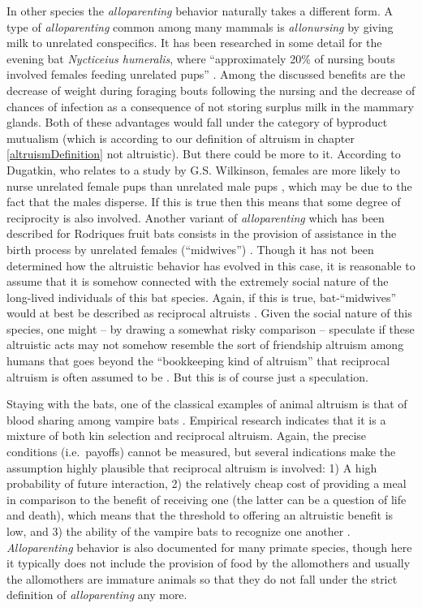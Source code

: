In other species the {\em alloparenting} behavior naturally takes a different
form. A type of {\em alloparenting} common among many mammals is {\em
  allonursing} by giving milk to unrelated conspecifics. It has been
researched in some detail for the evening bat {\em Nycticeius humeralis},
where ``approximately 20\% of nursing bouts involved females feeding unrelated
pups'' \cite[p.\  109]{dugatkin:1997}. Among the discussed benefits are the
decrease of weight during foraging bouts following the nursing and the
decrease of chances of infection as a consequence of not storing surplus milk
in the mammary glands. Both of these advantages would fall under the category
of byproduct mutualism (which is according to our definition of altruism in
chapter \ref{altruismDefinition} not altruistic). But there could be more to
it. According to Dugatkin, who relates to a study by G.S. Wilkinson, females
are more likely to nurse unrelated female pups than unrelated male pups
\cite[p.\ 109]{dugatkin:1997}, which may be due to the fact that the males
disperse. If
this is true then this means that some degree of reciprocity is also involved.
Another variant of {\em alloparenting} which has been described for Rodriques
fruit bats consists in the provision of assistance in the birth process by
unrelated females (``midwives'') \cite[p.\  109]{dugatkin:1997}. Though it has
not been determined how the altruistic behavior has evolved in this case, it
is reasonable to assume that it is somehow connected with the extremely social
nature of the long-lived individuals of this bat species. Again, if this is
true, bat-``midwives'' would at best be described as reciprocal altruists
\cite[p.\ 109]{dugatkin:1997}. Given the social nature of this species, one
might -- by drawing a somewhat risky comparison -- speculate if these
altruistic acts may not somehow resemble the sort of friendship altruism among
humans that goes beyond the ``bookkeeping kind of altruism'' that reciprocal
altruism is often assumed to be \cite[]{silk:2003}. But this is of course just
a speculation.

Staying with the bats, one of the classical examples of animal altruism is
that of blood sharing among vampire bats \cite[p.\ 113/114]{dugatkin:1997}.
Empirical research indicates that it is a mixture of both kin selection and
reciprocal altruism.  Again, the precise conditions (i.e.\ payoffs) cannot be
measured, but several indications make the assumption highly plausible that
reciprocal altruism is involved: 1) A high probability of future interaction,
2) the relatively cheap cost of providing a meal in comparison to the benefit
of receiving one (the latter can be a question of life and death), which means
that the threshold to offering an altruistic benefit is low, and 3) the ability
of the vampire bats to recognize one another \cite[p.\ 
114]{dugatkin:1997}.  {\em Alloparenting} behavior is also documented for many
primate species, though here it typically does not include the provision of
food by the allomothers and usually the allomothers are immature animals
\cite[p.\  138]{dugatkin:1997} so that they do not fall under the strict
definition of {\em alloparenting} any more.

